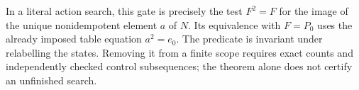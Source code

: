 \begin{remark*}
In a literal action search, this gate is precisely the test
$F^2=F$ for the image of the unique nonidempotent element $a$ of
$N$.  Its equivalence with $F=P_0$ uses the already imposed table
equation $a^2=e_0$.  The predicate is invariant under relabelling
the states.  Removing it from a finite scope requires exact counts
and independently checked control subsequences; the theorem alone
does not certify an unfinished search.
\end{remark*}

